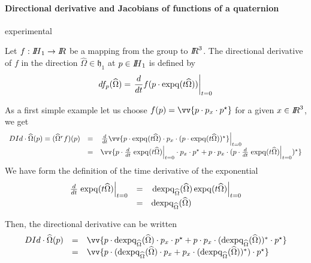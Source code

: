 \paragraph{Directional derivative and Jacobians of functions of a quaternion}
\begin{ndrva}
  experimental
\end{ndrva}

Let $f : \mbox{\rm $I\!\!H$}_1 \rightarrow \mbox{\rm $I\!\!R$} $ be a mapping from the group to $\mbox{\rm $I\!\!R$}^3$. The directional derivative of $f$ in the direction $\widehat \Omega \in \mathfrak h_1$ at $p\in \mbox{\rm $I\!\!H$}_1$ is
defined by
\begin{equation}
  \label{eq:139}
 df_p(\widehat \Omega) =\left. \frac{d}{dt} f(p\cdot \operatorname{expq}(t\widehat \Omega)) \right|_{t=0}
\end{equation}

As a first simple example let us choose $f(p) = \vv{p \glaw p_x \glaw p^\star}$ for a given $x \in \mbox{\rm $I\!\!R$}^3 $, we get
\begin{equation}
  \label{eq:142}
  \begin{array}{lcl}
    D Id \cdot \widehat \Omega (p) = (\widehat \Omega^r f )(p) &=& \left. \frac{d}{dt}\vv{p\glaw \expq(t\widehat \Omega) \glaw p_x \glaw (p \glaw \expq(t\widehat \Omega))^\star}  \right|_{t=0}\\
                                                               & = & \vv{p\glaw \frac{d}{dt}\left. \expq(t\widehat \Omega) \right|_{t=0} \glaw p_x \glaw p^\star +  p \glaw p_x \glaw (p \glaw\frac{d}{dt}\left. \expq(t\widehat \Omega) \right|_{t=0})^\star}\\
  \end{array}
\end{equation}
We have form the definition of the time derivative of the exponential
\begin{equation}
  \label{eq:143}
  \begin{array}{lcl}
    \frac{d}{dt}\left. \operatorname{expq}(t\widehat \Omega) \right|_{t=0} &=&  \left. \operatorname{dexpq}_{\widehat\Omega}(\widehat \Omega)\operatorname{expq}(t\widehat \Omega) \right|_{t=0} \\
                                                            &=&  \operatorname{dexpq}_{\widehat\Omega}(\widehat \Omega)
  \end{array}
\end{equation}

Then, the directional derivative can be written
\begin{equation}
  \label{eq:146}
  \begin{array}{lcl}
    D Id \cdot \widehat \Omega (p) &=& \vv{p\glaw \dexpq_{\widehat\Omega}(\widehat \Omega)\glaw p_x \glaw p^\star  + p \glaw p_x \glaw (\dexpq_{\widehat\Omega}(\widehat \Omega))^* \glaw  p^\star } \\
  &=& \vv{p\glaw ( \dexpq_{\widehat\Omega}(\widehat \Omega)\glaw p_x +   p_x \glaw (\dexpq_{\widehat\Omega}(\widehat \Omega))^*) \glaw  p^\star }
  \end{array}
\end{equation}




